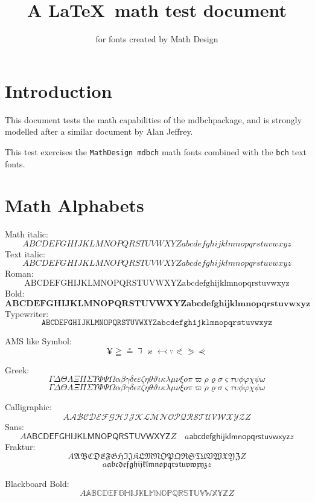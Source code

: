 \documentclass[fleqn]{article}
\title{A \LaTeX\ math test document}
\author{for fonts created by Math Design}
\let\omicron=o
\begin{document}
\maketitle

\section*{Introduction}

This document tests the math capabilities of the mdbchpackage, and is
strongly modelled after a similar document by Alan Jeffrey.

This test exercises the {\tt MathDesign mdbch} math fonts combined with the
{\tt bch} text fonts.

\section*{Math Alphabets}

Math italic:
$$
   ABCDEFGHIJKLMNOPQRSTUVWXYZ
   abcdefghijklmnopqrstuvwxyz
$$
Text italic:
$$
   \mathit{ABCDEFGHIJKLMNOPQRSTUVWXYZ
      abcdefghijklmnopqrstuvwxyz}
$$
Roman:
$$
   \mathrm{ABCDEFGHIJKLMNOPQRSTUVWXYZ
      abcdefghijklmnopqrstuvwxyz}
$$
Bold:
$$
   \mathbf{ABCDEFGHIJKLMNOPQRSTUVWXYZ
      abcdefghijklmnopqrstuvwxyz}
$$
Typewriter:
$$
   \mathtt{ABCDEFGHIJKLMNOPQRSTUVWXYZ
      abcdefghijklmnopqrstuvwxyz}
$$

AMS like Symbol:
$$
   \yen \geqq \circeq \daleth \varkappa \leftarrowtail \because
   \eqslantless  \eqslantgtr \curlyeqprec
$$

Greek:
$$
   \Gamma\Delta\Theta\Lambda\Xi\Pi\Sigma\Upsilon\Phi\Psi\Omega
  \alpha\beta\gamma\delta\epsilon\varepsilon\zeta\eta\theta\vartheta
   \iota\kappa\lambda\mu\nu\xi\omicron\pi\varpi\rho\varrho
   \sigma\varsigma\tau\upsilon\phi\varphi\chi\psi\omega
$$
{
$$
       \Gamma\Delta\Theta\Lambda\Xi\Pi\Sigma\Upsilon\Phi\Psi\Omega
  \alpha\beta\gamma\delta\epsilon\varepsilon\zeta\eta\theta\vartheta
   \iota\kappa\lambda\mu\nu\xi\omicron\pi\varpi\rho\varrho
   \sigma\varsigma\tau\upsilon\phi\varphi\chi\psi\omega
$$}

Calligraphic:
$$A\mathcal{ABCDEFGHIJKLMNOPQRSTUVWXYZ}Z$$
Sans:
$$
   A\mathsf{ABCDEFGHIJKLMNOPQRSTUVWXYZ}Z \quad
      a\mathsf{abcdefghijklmnopqrstuvwxyz}z
$$
Fraktur:
$$
   A\mathfrak{ABCDEFGHIJKLMNOPQRSTUVWXYZ}Z 
$$
$$
   a\mathfrak{abcdefghijklmnopqrstuvwxyz}z
$$

Blackboard Bold:
$$
   A\mathbb{ABCDEFGHIJKLMNOPQRSTUVWXYZ}Z
$$
\end{document}
